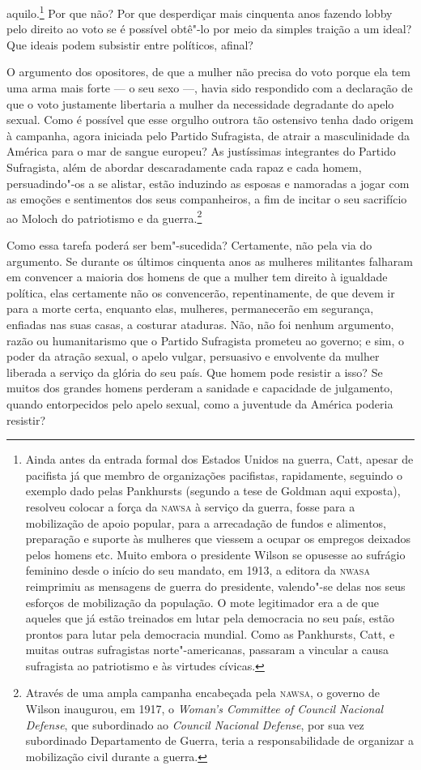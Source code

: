 aquilo.\footnote{Ainda antes da entrada formal dos Estados Unidos na
  guerra, Catt, apesar de pacifista já que membro de organizações pacifistas,
  rapidamente, seguindo o exemplo dado pelas Pankhursts (segundo a tese
  de Goldman aqui exposta), resolveu colocar a força da \textsc{nawsa} à
  serviço da guerra, fosse para a mobilização de apoio popular, para a
  arrecadação de fundos e alimentos, preparação e suporte às mulheres
  que viessem a ocupar os empregos deixados pelos homens etc. Muito
  embora o presidente Wilson se opusesse ao sufrágio feminino desde o
  início do seu mandato, em 1913, a editora da \textsc{nwasa} reimprimiu as
  mensagens de guerra do presidente, valendo"-se delas nos seus esforços
  de mobilização da população. O mote legitimador era a de que aqueles
  que já estão treinados em lutar pela democracia no seu país, estão
  prontos para lutar pela democracia mundial. Como as Pankhursts, Catt,
  e muitas outras sufragistas norte"-americanas, passaram a vincular a
  causa sufragista ao patriotismo e às virtudes cívicas.} Por que não?
Por que desperdiçar mais cinquenta anos fazendo lobby pelo direito ao
voto se é possível obtê"-lo por meio da simples traição a um ideal? Que
ideais podem subsistir entre políticos, afinal?

O argumento dos opositores, de que a mulher não precisa do voto porque
ela tem uma arma mais forte --- o seu sexo ---, havia sido respondido com
a declaração de que o voto justamente libertaria a mulher da necessidade
degradante do apelo sexual. Como é possível que esse orgulho outrora tão ostensivo
tenha dado origem à campanha, agora iniciada pelo Partido Sufragista, de
atrair a masculinidade da América para o mar de sangue europeu? As
justíssimas integrantes do Partido Sufragista, além de abordar
descaradamente cada rapaz e cada homem, persuadindo"-os a se alistar,
estão induzindo as esposas e namoradas a jogar com as emoções e
sentimentos dos seus companheiros, a fim de incitar o seu sacrifício ao
Moloch do patriotismo e da guerra.\footnote{Através de uma ampla
  campanha encabeçada pela \textsc{nawsa}, o governo de Wilson inaugurou, em
  1917, o \textit{Woman's Committee of Council Nacional Defense}, que
  subordinado ao \textit{Council Nacional Defense}, por sua vez
  subordinado Departamento de Guerra, teria a responsabilidade de
  organizar a mobilização civil durante a guerra.}

Como essa tarefa poderá ser bem"-sucedida? Certamente, não pela via do
argumento. Se durante os últimos cinquenta anos as mulheres militantes
falharam em convencer a maioria dos homens de que a mulher tem direito
à igualdade política, elas certamente não os convencerão,
repentinamente, de que devem ir para a morte certa, enquanto elas,
mulheres, permanecerão em segurança, enfiadas nas suas casas, a costurar
ataduras. Não, não foi nenhum argumento, razão ou humanitarismo que o\label{argumento}
Partido Sufragista prometeu ao governo; e sim, o poder da atração
sexual, o apelo vulgar, persuasivo e envolvente da mulher liberada a
serviço da glória do seu país. Que homem pode resistir a isso? Se muitos
dos grandes homens perderam a sanidade e capacidade de julgamento,
quando entorpecidos pelo apelo sexual, como a juventude da América
poderia resistir?


